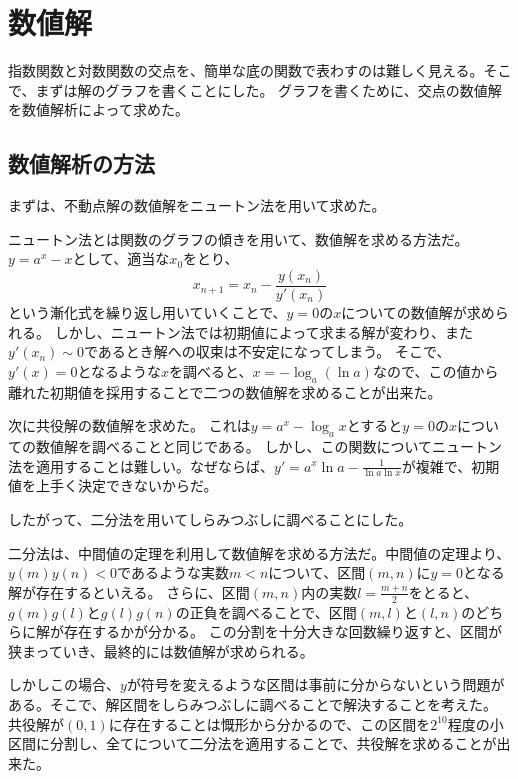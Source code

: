 \section{数値解}
	指数関数と対数関数の交点を、簡単な底の関数で表わすのは難しく見える。そこで、まずは解のグラフを書くことにした。
	グラフを書くために、交点の数値解を数値解析によって求めた。

\subsection{数値解析の方法}
	まずは、不動点解の数値解をニュートン法を用いて求めた。

	ニュートン法とは関数のグラフの傾きを用いて、数値解を求める方法だ。$y=a^x-x$として、適当な$x_0$をとり、
	\[
		x_{n+1} = x_n - \frac{y(x_n)}{y'(x_n)}
	\]
	という漸化式を繰り返し用いていくことで、$y=0$の$x$についての数値解が求められる。
	しかし、ニュートン法では初期値によって求まる解が変わり、また$y'(x_n) \sim 0$であるとき解への収束は不安定になってしまう。
	そこで、$y'(x) = 0$となるような$x$を調べると、$x = -\log_{a} \left(\ln{a}\right)$なので、この値から離れた初期値を採用することで二つの数値解を求めることが出来た。

	次に共役解の数値解を求めた。
	これは$y = a^{x} - \log_{a} x$とすると$y=0$の$x$についての数値解を調べることと同じである。
	しかし、この関数についてニュートン法を適用することは難しい。なぜならば、$y' = a^{x}\ln{a} - \frac{1}{\ln{a}\ln{x}}$が複雑で、初期値を上手く決定できないからだ。

	したがって、二分法を用いてしらみつぶしに調べることにした。

	二分法は、中間値の定理を利用して数値解を求める方法だ。中間値の定理より、$y(m)y(n) < 0$であるような実数$m < n$について、区間$(m,n)$に$y = 0$となる解が存在するといえる。
	さらに、区間$(m,n)$内の実数$l = \frac{m+n}{2}$をとると、$g(m)g(l)$と$g(l)g(n)$の正負を調べることで、区間$(m,l)$と$(l,n)$のどちらに解が存在するかが分かる。
	この分割を十分大きな回数繰り返すと、区間が狭まっていき、最終的には数値解が求められる。

	しかしこの場合、$y$が符号を変えるような区間は事前に分からないという問題がある。そこで、解区間をしらみつぶしに調べることで解決することを考えた。
	共役解が$(0,1)$に存在することは慨形から分かるので、この区間を$2^{10}$程度の小区間に分割し、全てについて二分法を適用することで、共役解を求めることが出来た。

